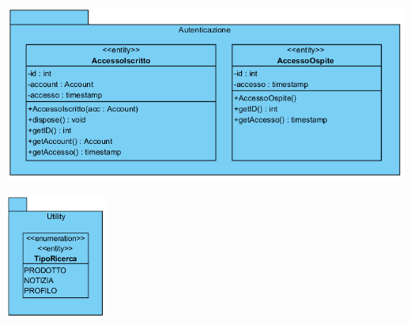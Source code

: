 \begin{center}
			\includegraphics[width=\textwidth]{assets/visualParadigm/classi/Autenticazione}
\end{center}

\begin{center}
			\includegraphics[width=0.25\textwidth]{assets/visualParadigm/classi/Utility}
\end{center}

